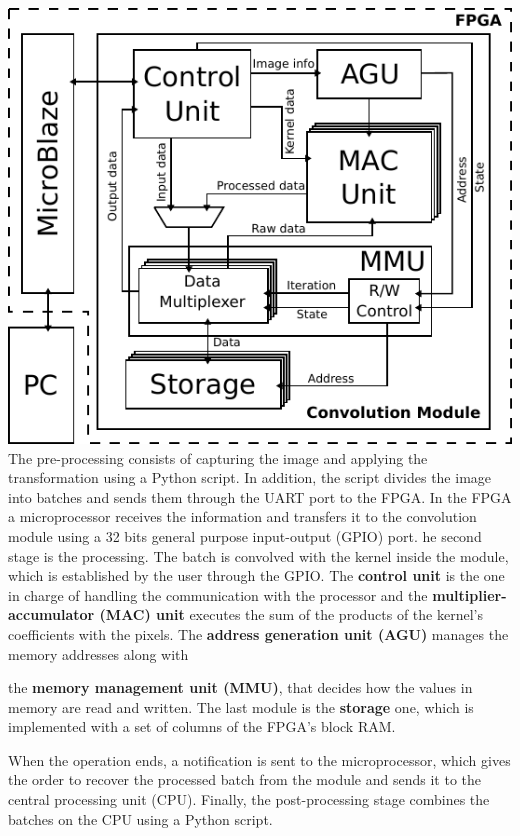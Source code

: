 \documentclass[a1paper,portrait,fontscale=0.43]{baposter}
\begin{document}
\begin{poster}
{\begin{multicols}{2}
    \includegraphics[width=\linewidth]{general}
\vfill\null
\columnbreak
The pre-processing consists of capturing the image and applying
the transformation using a Python script. In addition, the script divides the
image into batches and sends them through the UART port to the FPGA.  In the FPGA a microprocessor receives the
information and transfers it to the convolution module using a 32 bits general
purpose input-output (GPIO) port. 
he second stage is the processing. The batch is convolved with the kernel inside
the module, which is established by the user through the GPIO.
The \textbf{control unit} is the one in charge of handling the communication with
the processor and the \textbf{multiplier-accumulator (MAC) unit} executes the sum
of the products of the kernel's coefficients with the pixels. The \textbf{address generation unit (AGU)}
manages the memory addresses along with
\end{multicols}
the \textbf{memory management unit (MMU)}, that decides how the values in memory
are read and written.
The last module is the \textbf{storage} one, which is
implemented with a set of columns of the FPGA's block RAM. 

When the operation ends, a notification is sent to the microprocessor,
which gives the order to recover the processed batch from the module and sends it
to the central processing unit (CPU). Finally, the post-processing stage combines
the batches on the CPU using a Python script.

}
\end{poster}
\end{document}
